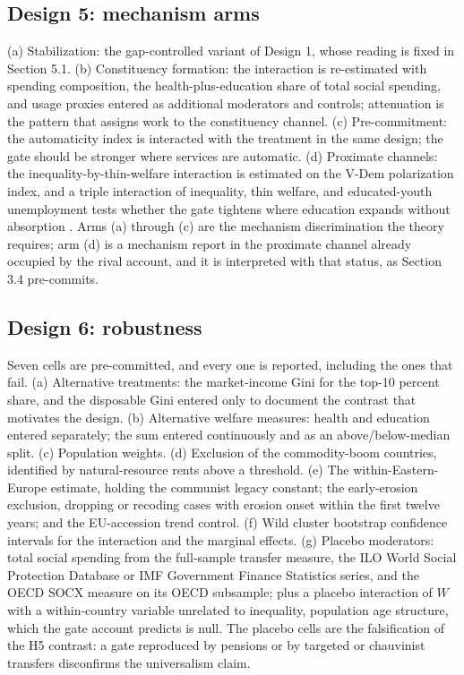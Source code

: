 \subsection{Design 5: mechanism arms}

(a) Stabilization: the gap-controlled variant of Design 1, whose reading is fixed in Section 5.1. (b) Constituency formation: the interaction is re-estimated with spending composition, the health-plus-education share of total social spending, and usage proxies entered as additional moderators and controls; attenuation is the pattern that assigns work to the constituency channel. (c) Pre-commitment: the automaticity index is interacted with the treatment in the same design; the gate should be stronger where services are automatic. (d) Proximate channels: the inequality-by-thin-welfare interaction is estimated on the V-Dem polarization index, and a triple interaction of inequality, thin welfare, and educated-youth unemployment tests whether the gate tightens where education expands without absorption \citep{CampanteChor2012}. Arms (a) through (c) are the mechanism discrimination the theory requires; arm (d) is a mechanism report in the proximate channel already occupied by the rival account, and it is interpreted with that status, as Section 3.4 pre-commits.

\subsection{Design 6: robustness}

Seven cells are pre-committed, and every one is reported, including the ones that fail. (a) Alternative treatments: the market-income Gini for the top-10 percent share, and the disposable Gini entered only to document the contrast that motivates the design. (b) Alternative welfare measures: health and education entered separately; the sum entered continuously and as an above/below-median split. (c) Population weights. (d) Exclusion of the commodity-boom countries, identified by natural-resource rents above a threshold. (e) The within-Eastern-Europe estimate, holding the communist legacy constant; the early-erosion exclusion, dropping or recoding cases with erosion onset within the first twelve years; and the EU-accession trend control. (f) Wild cluster bootstrap confidence intervals for the interaction and the marginal effects. (g) Placebo moderators: total social spending from the full-sample transfer measure, the ILO World Social Protection Database or IMF Government Finance Statistics series, and the OECD SOCX measure on its OECD subsample; plus a placebo interaction of $W$ with a within-country variable unrelated to inequality, population age structure, which the gate account predicts is null. The placebo cells are the falsification of the H5 contrast: a gate reproduced by pensions or by targeted or chauvinist transfers disconfirms the universalism claim.

